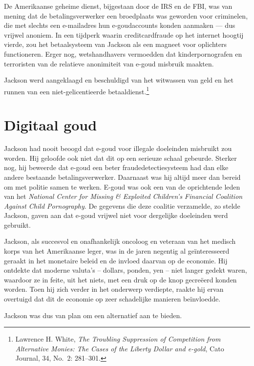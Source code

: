 \documentclass[
  a5paper,
  smalldemyvopaper,11pt,twoside,onecolumn,openright,extrafontsizes,
hidelinks]{memoir}
\begin{document}
De Amerikaanse geheime dienst, bijgestaan door de IRS en de FBI, was van
mening dat de betalingsverwerker een broedplaats was geworden voor
criminelen, die met slechts een e-mailadres hun e-goudaccounts konden
aanmaken --- dus vrijwel anoniem. In een tijdperk waarin
creditcardfraude op het internet hoogtij vierde, zou het betaalsysteem
van Jackson als een magneet voor oplichters functioneren. Erger nog,
wetshandhavers vermoedden dat kinderpornografen en terroristen van de
relatieve anonimiteit van e-goud misbruik maakten.

Jackson werd aangeklaagd en beschuldigd van het witwassen van geld en
het runnen van een niet-gelicentieerde betaaldienst.\footnote{\hspace{0pt}Lawrence
  H. White, \emph{The Troubling Suppression of Competition from
  Alternative Monies: The Cases of the Liberty Dollar and e-gold}, Cato
  Journal, 34, No.~2: 281--301.}

\section*{Digitaal goud}\label{digitaal-goud}


Jackson had nooit beoogd dat e-goud voor illegale doeleinden misbruikt
zou worden. Hij geloofde ook niet dat dit op een serieuze schaal
gebeurde. Sterker nog, hij beweerde dat e-goud een beter
fraudedetectiesysteem had dan elke andere bestaande betalingsverwerker.
Daarnaast was hij altijd meer dan bereid om met politie samen te werken.
E-goud was ook een van de oprichtende leden van het \emph{National
Center for Missing \& Exploited Children's Financial Coalition Against
Child Pornography}. De gegevens die deze coalitie verzamelde, zo stelde
Jackson, gaven aan dat e-goud vrijwel niet voor dergelijke doeleinden
werd gebruikt.

Jackson, als succesvol en onafhankelijk oncoloog en veteraan van het
medisch korps van het Amerikaanse leger, was in de jaren negentig al
geïnteresseerd geraakt in het monetaire beleid en de invloed daarvan op
de economie. Hij ontdekte dat moderne valuta's -- dollars, ponden, yen
-- niet langer gedekt waren, waardoor ze in feite, uit het niets, met
een druk op de knop gecreëerd konden worden. Toen hij zich verder in het
onderwerp verdiepte, raakte hij ervan overtuigd dat dit de economie op
zeer schadelijke manieren beïnvloedde.

Jackson was dus van plan om een alternatief aan te bieden.
\end{document}
